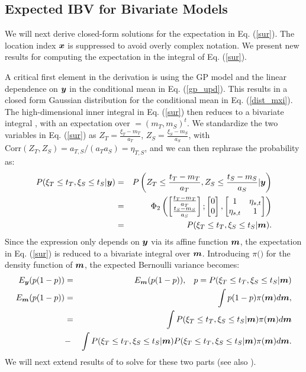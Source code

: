 \documentclass[aoas]{imsart}
\begin{document}
\subsection{Expected IBV for Bivariate Models}

We will next derive closed-form solutions for the expectation in
Eq. (\ref{sur}). The location index ${\boldsymbol x}$ is suppressed to avoid
overly complex notation. We present new results for computing the
expectation in the integral of Eq. (\ref{sur}).

A critical first element in the derivation is using the GP model and the
linear dependence on ${\boldsymbol y}$ in the conditional mean in
Eq. (\ref{gp_upd}). This results in a closed form Gaussian
distribution for the conditional mean in Eq. (\ref{dist_mxi}). The
high-dimensional inner integral in Eq. (\ref{sur}) then reduces to a
bivariate integral \citep{bhattacharjya2013value, chevalier2014fast},
with an expectation over $\bm=(m_{T},m_{S})^t$.  We standardize the two
variables in Eq. (\ref{sur}) as   $Z_T=\frac{\xi_T-m_{T}}{a_{T}}$,
$Z_S=\frac{\xi_S-m_{S}}{a_{S}}$, with
$\mbox{Corr}(Z_T,Z_S)=a_{T,S}/(a_{T} a_{S})=\eta_{T,S}$, and we can
then rephrase the probability as: 
\begin{eqnarray}\label{ytom}
   P(\xi_T \leq t_T, \xi_S \leq t_S|\by) &=& P \left( Z_T \leq\frac{t_T-m_{T}}{a_{T}}, Z_S \leq\frac{t_S-m_{S}}{a_{S}}|\by \right) \nonumber \\
   &=& \Phi_2 \begin{pmatrix} 
\begin{bmatrix} \frac{t_T-m_{T}}{a_{T}}\\
\frac{t_S-m_{S}}{a_{S}}
\end{bmatrix};
 \begin{bmatrix} 0\\
0
\end{bmatrix},\begin{bmatrix}
1 & \eta_{s,t}  \\
\eta_{s,t}   & 1  
\end{bmatrix}\end{pmatrix} \nonumber \\
&=& P(\xi_T \leq t_T, \xi_S \leq t_S|\bm).
\end{eqnarray}
Since the expression only depends on ${\boldsymbol y}$ via its affine function
${\boldsymbol m}$, the expectation in Eq. (\ref{sur}) is reduced to a bivariate
integral over ${\boldsymbol m}$.  Introducing $\pi(\bm)$ for the density function
of ${\boldsymbol m}$, the expected Bernoulli variance becomes:
\begin{eqnarray}
\label{eq:var2}
E_{\by}(p(1-p)) &=& E_{\bm}(p(1-p)), \hspace{3mm} p=P(\xi_T \leq t_T, \xi_S \leq t_S|\bm) \nonumber \\
E_{\bm}(p(1-p)) & = & \int p(1-p) \pi(\bm) d\bm, \nonumber \\
 &=& \int P(\xi_T \leq t_T, \xi_S \leq t_S|\bm)  \pi(\bm) d\bm \nonumber  \\
&-& \int P(\xi_T \leq t_T, \xi_S \leq t_S|\bm) P(\xi_T \leq t_T, \xi_S \leq t_S|\bm) \pi(\bm) d\bm. 
\end{eqnarray}
We will next extend results of \cite{chevalier2014fast} to solve for
these two parts (see also \cite{stroh}).
\end{document}
